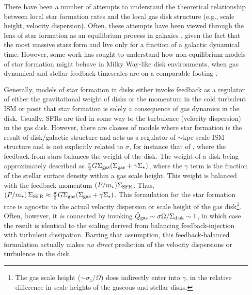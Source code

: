 \documentclass[usletter,fleqn,usenatbib]{mnras}
\begin{document}
There have been a number of attempts to understand the theoretical relationship between local star formation rates and the local gas disk structure (e.g., scale height, velocity dispersion).  Often, these attempts have been viewed through the lens of star formation as an equilibrium process in galaxies \citep[e.g.,][]{Ostriker2011, Faucher-Giguere2013, Hayward2017}, given the fact that the most massive stars form and live only for a fraction of a galactic dynamical time.  However, some work has sought to understand how non-equilibrium models of star formation might behave in Milky Way-like disk environments, when gas dynamical and stellar feedback timescales are on a comparable footing \citep{Benincasa2016, Orr2019}. 

Generally, models of star formation in disks either invoke feedback as a regulator of either the gravitational weight of disks or the momentum in the cold turbulent ISM or posit that star formation is solely a consequence of gas dynamics in the disk.  Usually, SFRs are tied in some way to the turbulence (velocity dispersion) in the gas disk. However, there are classes of models where star formation is the result of disk/galactic structure and acts as a regulator of $\sim$kpc-scale ISM structure and is not explicitly related to $\sigma$, for instance that of \citet{Ostriker2011}, where the feedback from stars balances the weight of the disk.  The weight of a disk being approximately described as $\frac{\pi}{2}G\Sigma_{\rm gas} (\Sigma_{\rm gas} + \gamma \Sigma_\star)$, where the $\gamma$ term is the fraction of the stellar surface density within a gas scale height.  This weight is balanced with the feedback momentum $(P/m_\star) \Sigma_{\rm SFR}$.  Thus, $\left({P}/{m_\star} \right) \Sigma_{\rm SFR} \approx \frac{\pi}{2} G \Sigma_{\rm gas} (\Sigma_{\rm gas} + \gamma \Sigma_\star)$.
This formulation for the star formation rate is agnostic to the actual velocity dispersion or scale height of the gas disk\footnote{The gas scale height ($\sim \sigma_z/\Omega$) does indirectly enter into $\gamma$, in the relative difference in scale heights of the gaseous and stellar disks.}.  Often, however, it \emph{is} connected by invoking $\tilde Q_{\rm gas} \sim \sigma \Omega/\Sigma_{\rm disk} \sim 1$, in which case the result is identical to the scaling derived from balancing feedback-injection with turbulent dissipation.  Barring that assumption, this feedback-balanced formulation actually makes \emph{no direct} prediction of the velocity dispersions or turbulence in the disk.
\end{document}
